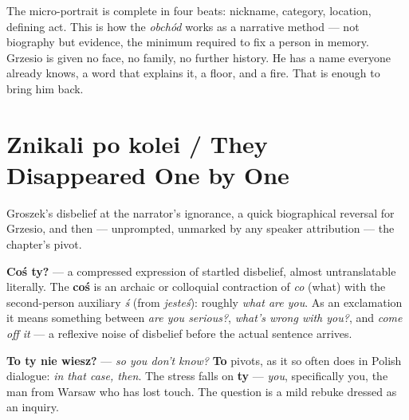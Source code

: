 \medskip
The micro-portrait is complete in four beats: nickname,
category, location, defining act. This is how the \textit{obchód}
works as a narrative method --- not biography but evidence,
the minimum required to fix a person in memory. Grzesio
is given no face, no family, no further history. He has a
name everyone already knows, a word that explains it, a floor,
and a fire. That is enough to bring him back.

\section{Znikali po kolei / They Disappeared One by One}



Groszek's disbelief at the narrator's ignorance, a quick
biographical reversal for Grzesio, and then --- unprompted,
unmarked by any speaker attribution --- the chapter's pivot.

\textbf{Coś ty?} --- a compressed expression of startled
disbelief, almost untranslatable literally. The \textbf{coś}
is an archaic or colloquial contraction of \textit{co} (what)
with the second-person auxiliary \textit{ś} (from
\textit{jesteś}): roughly \textit{what are you}. As an
exclamation it means something between \textit{are you
serious?}, \textit{what's wrong with you?}, and \textit{come
off it} --- a reflexive noise of disbelief before the actual
sentence arrives.

\textbf{To ty nie wiesz?} --- \textit{so you don't know?}
\textbf{To} pivots, as it so often does in Polish dialogue:
\textit{in that case, then}. The stress falls on \textbf{ty}
--- \textit{you}, specifically you, the man from Warsaw who
has lost touch. The question is a mild rebuke dressed as
an inquiry.

